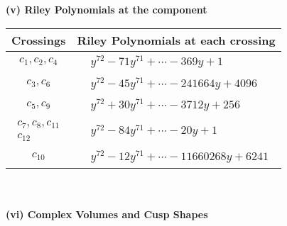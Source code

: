 \documentclass[1p]{elsarticle_modified}
\theoremstyle{definition}
\begin{document}
\newpage\renewcommand{\arraystretch}{1}
\flushleft \textbf{(v) Riley Polynomials at the component}\newline \\
\begin{tabular}{m{50pt}|m{274pt}}
Crossings & \hspace{64pt}Riley Polynomials at each crossing \\
\hline $$\begin{aligned}c_{1},c_{2},c_{4}\end{aligned}$$&$\begin{aligned}
&y^{72}-71 y^{71}+\cdots-369 y+1
\end{aligned}$\\
\hline $$\begin{aligned}c_{3},c_{6}\end{aligned}$$&$\begin{aligned}
&y^{72}-45 y^{71}+\cdots-241664 y+4096
\end{aligned}$\\
\hline $$\begin{aligned}c_{5},c_{9}\end{aligned}$$&$\begin{aligned}
&y^{72}+30 y^{71}+\cdots-3712 y+256
\end{aligned}$\\
\hline $$\begin{aligned}c_{7},c_{8},c_{11}\\c_{12}\end{aligned}$$&$\begin{aligned}
&y^{72}-84 y^{71}+\cdots-20 y+1
\end{aligned}$\\
\hline $$\begin{aligned}c_{10}\end{aligned}$$&$\begin{aligned}
&y^{72}-12 y^{71}+\cdots-11660268 y+6241
\end{aligned}$\\
\hline
\end{tabular}\\~\\
\newpage\flushleft \textbf{(vi) Complex Volumes and Cusp Shapes}
\end{document}
